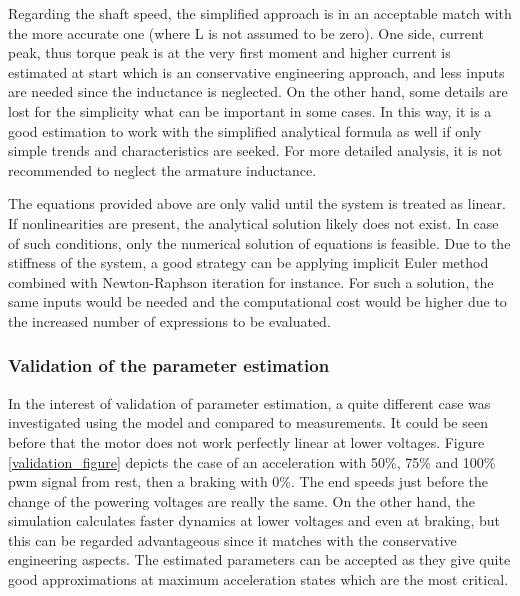 \documentclass[12pt,english,twoside]{article}
\begin{document}
Regarding the shaft speed, the simplified approach is in an acceptable match with the more accurate one (where L is not assumed to be zero). One side, current peak, thus torque peak is at the very first moment and higher current is  estimated at start which is an conservative engineering approach, and less inputs are needed since the inductance is neglected. On the other hand, some details are lost for the simplicity what can be important in some cases. In this way, it is a good estimation to work with the simplified analytical formula as well if only simple trends and characteristics are seeked. For more detailed analysis, it is not recommended to neglect the armature inductance. 

The equations provided above are only valid until the system is treated as linear. If nonlinearities are present, the analytical solution likely does not exist. In case of such conditions, only the numerical solution of equations is feasible. Due to the stiffness of the system, a good strategy can be applying implicit Euler method combined with Newton-Raphson iteration for instance. For such a solution, the same inputs would be needed and the computational cost would be higher due to the increased number of expressions to be evaluated.

\subsubsection{Validation of the parameter estimation}
In the interest of validation of parameter estimation, a quite different case was investigated using the model and compared to measurements. It could be seen before that the motor does not work perfectly linear at lower voltages. Figure \ref{validation_figure} depicts the case of an acceleration with 50\%, 75\% and 100\% pwm signal from rest, then a braking with  0\%. The end speeds just before the change of the powering voltages are really the same. On the other hand, the simulation calculates faster dynamics at lower voltages and even at braking, but this can be regarded advantageous since it matches with the conservative engineering aspects. The estimated parameters can be accepted as they give quite good approximations at maximum acceleration states which are the most critical.
\end{document}
